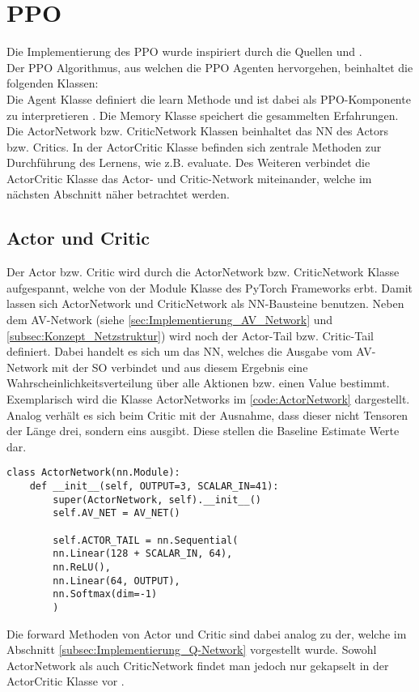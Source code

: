 \section{PPO} \label{sec:Implementierung_PPO}
Die Implementierung des PPO wurde inspiriert durch die Quellen \citep{pytorch_minimal_ppo} und \citep{Charles2013}.\\
Der PPO Algorithmus, aus welchen die PPO Agenten hervorgehen, beinhaltet die folgenden Klassen:\\
Die Agent Klasse definiert die learn Methode und ist dabei als PPO-Komponente zu interpretieren .
Die Memory Klasse speichert die gesammelten Erfahrungen.
Die ActorNetwork bzw. CriticNetwork Klassen beinhaltet das NN des Actors bzw. Critics.
In der ActorCritic Klasse befinden sich zentrale Methoden zur Durchführung des Lernens, wie z.B. evaluate. 
Des Weiteren verbindet die ActorCritic Klasse das Actor- und Critic-Network miteinander, welche im nächsten Abschnitt näher betrachtet werden.

\subsection{Actor und Critic} \label{subsec:Implementierung_Actor_und_Critic}
Der Actor bzw. Critic wird durch die ActorNetwork bzw. CriticNetwork Klasse aufgespannt, welche von der Module Klasse des PyTorch Frameworks erbt. Damit lassen sich ActorNetwork und CriticNetwork als NN-Bausteine benutzen.
Neben dem AV-Network (siehe \autoref{sec:Implementierung_AV_Network} und \autoref{subsec:Konzept_Netzstruktur}) wird noch der Actor-Tail bzw. Critic-Tail definiert. Dabei handelt es sich um das NN, welches die Ausgabe vom AV-Network mit der SO verbindet und aus diesem Ergebnis eine Wahrscheinlichkeitsverteilung über alle Aktionen bzw. einen Value bestimmt. 
Exemplarisch wird die Klasse ActorNetworks im \autoref{code:ActorNetwork} dargestellt. Analog verhält es sich beim Critic mit der Ausnahme, dass dieser nicht Tensoren der Länge drei, sondern eins ausgibt. Diese stellen die Baseline Estimate Werte  dar.
\begin{lstlisting}[caption=ActorNetwork, label=code:ActorNetwork, style=Python]
class ActorNetwork(nn.Module):
	def __init__(self, OUTPUT=3, SCALAR_IN=41):
		super(ActorNetwork, self).__init__()
		self.AV_NET = AV_NET()
		
		self.ACTOR_TAIL = nn.Sequential(
		nn.Linear(128 + SCALAR_IN, 64),
		nn.ReLU(),
		nn.Linear(64, OUTPUT),
		nn.Softmax(dim=-1)
		)
\end{lstlisting}
Die forward Methoden von Actor und Critic sind dabei analog zu der, welche im Abschnitt \autoref{subsec:Implementierung_Q-Network} vorgestellt wurde. 
Sowohl ActorNetwork als auch CriticNetwork findet man jedoch nur gekapselt in der ActorCritic Klasse vor .

